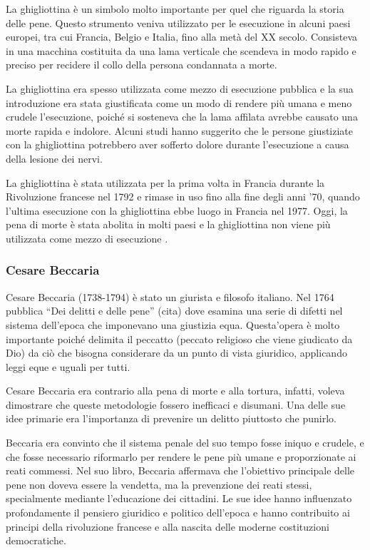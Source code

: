 \documentclass[a4paper, 12pt]{article}
\newcommand{\quotes}[1]{``#1''}
\begin{document}
La ghigliottina\cite{ghigliottina} è un simbolo molto importante per quel che riguarda
la storia delle pene.
Questo strumento veniva utilizzato per le esecuzione in alcuni paesi europei,
tra cui Francia, Belgio e Italia, fino alla metà del XX secolo.
Consisteva in una macchina costituita da una lama
verticale che scendeva in modo rapido e preciso per recidere il
collo della persona condannata a morte.

La ghigliottina era spesso utilizzata come mezzo di esecuzione pubblica
e la sua introduzione era stata giustificata come un modo di rendere più umana
e meno crudele l'esecuzione, poiché si sosteneva che la lama affilata
avrebbe causato una morte rapida e indolore.
Alcuni studi hanno suggerito che le persone giustiziate con la
ghigliottina potrebbero aver sofferto dolore durante l'esecuzione
a causa della lesione dei nervi.

La ghigliottina è stata utilizzata per la prima volta in Francia durante la Rivoluzione francese
nel 1792 e rimase in uso fino alla fine degli anni '70,
quando l'ultima esecuzione con la ghigliottina ebbe luogo in Francia nel 1977.
Oggi, la pena di morte è stata abolita in molti paesi e la ghigliottina non viene più
utilizzata come mezzo di esecuzione \cite{ghigliottina}.

\subsubsection{Cesare Beccaria}

Cesare Beccaria\cite{cesare} (1738-1794) è stato un giurista e filosofo italiano.
Nel 1764 pubblica \quotes{Dei delitti e delle pene} (cita) 
dove esamina una serie di difetti nel sistema dell'epoca che imponevano una giustizia equa.
Questa'opera è molto importante poiché delimita il peccatto (peccato religioso
che viene giudicato da Dio) da ciò che bisogna considerare da un punto di vista giuridico,
applicando leggi eque e uguali per tutti.

Cesare Beccaria era contrario alla pena di morte e alla tortura, infatti,
voleva dimostrare che queste metodologie fossero inefficaci e disumani.
Una delle sue idee primarie era l'importanza di prevenire un delitto piuttosto che punirlo.

Beccaria era convinto che il sistema penale del suo tempo fosse iniquo e crudele,
e che fosse necessario riformarlo per rendere le pene più umane e proporzionate ai reati commessi.
Nel suo libro, Beccaria affermava che l'obiettivo principale delle pene non doveva essere la vendetta,
ma la prevenzione dei reati stessi, specialmente mediante l'educazione dei cittadini.
Le sue idee hanno influenzato profondamente il pensiero giuridico e politico dell'epoca
e hanno contribuito ai principi della rivoluzione francese e alla nascita delle moderne
costituzioni democratiche.
\end{document}
